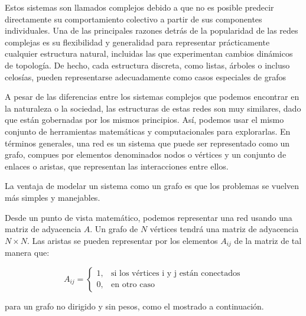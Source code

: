 Estos sistemas son llamados complejos debido a que no es posible predecir directamente su 
comportamiento colectivo a partir de sus componentes individuales. Una de las principales razones detrás de 
la popularidad de las redes complejas es su flexibilidad
y generalidad para representar prácticamente cualquier estructura natural, incluidas las que experimentan 
cambios dinámicos de topología. De hecho, cada estructura discreta, como listas, árboles o incluso celosías,
pueden representarse adecuadamente como casos especiales de grafos\cite{CN-review}

A pesar de las diferencias entre los sistemas complejos que podemos encontrar en la naturaleza o la sociedad, 
las estructuras de estas redes son muy similares, dado que están gobernadas por los mismos principios. Así, 
podemos usar el mismo conjunto de herramientas matemáticas y computacionales para explorarlas. En términos 
generales, una red es un sistema que puede ser representado como un grafo, compues por elementos denominados nodos 
o vértices y un conjunto de enlaces o aristas, que representan las interacciones entre ellos.\cite{caldarelli2007scale}

La ventaja de modelar un sistema como un grafo es que los problemas se vuelven más simples y manejables.

Desde un punto de vista matemático, podemos representar una red usando una matriz de adyacencia $A$. Un grafo 
de $N$ vértices tendrá una matriz de adyacencia $N \times N$. Las aristas se pueden representar por los elementos 
$A_{ij}$ de la matriz de tal manera que: 

\begin{equation}
    A_{ij}=
    \begin{cases}
      1, & \text{si los vértices i y j están conectados}\\
      0, & \text{en otro caso}
    \end{cases}
\end{equation}

para un grafo no dirigido y sin pesos, como el mostrado a continuación. 

